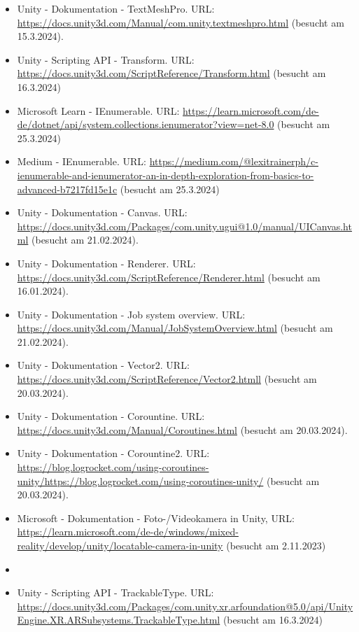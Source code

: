 \begin{itemize}[leftmargin=0pt]
    \item Unity - Dokumentation - TextMeshPro. {\scriptsize URL:}  \url{https://docs.unity3d.com/Manual/com.unity.textmeshpro.html} (besucht am 15.3.2024).
    \item Unity - Scripting API - Transform. {\scriptsize URL:}  \url{https://docs.unity3d.com/ScriptReference/Transform.html} (besucht am 16.3.2024)
    \item Microsoft Learn - IEnumerable. {\scriptsize URL:}  \url{https://learn.microsoft.com/de-de/dotnet/api/system.collections.ienumerator?view=net-8.0} (besucht am 25.3.2024)
    \item Medium - IEnumerable. {\scriptsize URL:}  \url{https://medium.com/@lexitrainerph/c-ienumerable-and-ienumerator-an-in-depth-exploration-from-basics-to-advanced-b7217fd15e1c} (besucht am 25.3.2024)
    \item Unity - Dokumentation -  Canvas. {\scriptsize URL:} \url{https://docs.unity3d.com/Packages/com.unity.ugui@1.0/manual/UICanvas.html} (besucht am 21.02.2024).
    \item Unity - Dokumentation - Renderer. {\scriptsize URL:} \url{https://docs.unity3d.com/ScriptReference/Renderer.html} (besucht am 16.01.2024).
    \item Unity - Dokumentation - Job system overview. {\scriptsize URL:} \url{https://docs.unity3d.com/Manual/JobSystemOverview.html} (besucht am 21.02.2024).
    \item Unity - Dokumentation - Vector2. {\scriptsize URL:} \url{https://docs.unity3d.com/ScriptReference/Vector2.htmll} (besucht am 20.03.2024).
    \item Unity - Dokumentation - Corountine. {\scriptsize URL:} \url{https://docs.unity3d.com/Manual/Coroutines.html} (besucht am 20.03.2024).
    \item Unity - Dokumentation - Corountine2. {\scriptsize URL:} \url{https://blog.logrocket.com/using-coroutines-unity/https://blog.logrocket.com/using-coroutines-unity/} (besucht am 20.03.2024).
    \item Microsoft - Dokumentation - Foto-/Videokamera in Unity, {\scriptsize URL:} \url{https://learn.microsoft.com/de-de/windows/mixed-reality/develop/unity/locatable-camera-in-unity} (besucht am 2.11.2023)
    \item \item Unity - Scripting API - TrackableType. {\scriptsize URL:}  \url{https://docs.unity3d.com/Packages/com.unity.xr.arfoundation@5.0/api/UnityEngine.XR.ARSubsystems.TrackableType.html} (besucht am 16.3.2024)

\end{itemize}

